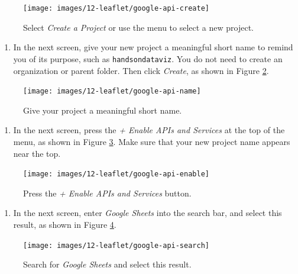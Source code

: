\documentclass[
  english,
]{book}
\providecommand{\tightlist}{%
  \setlength{\itemsep}{0pt}\setlength{\parskip}{0pt}}
\begin{document}
\begin{figure}
\texttt{[image: images/12-leaflet/google-api-create]} \caption{Select \emph{Create a Project} or use the menu to select a new project.}\label{fig:google-api-create}
\end{figure}

\begin{enumerate}
\def\labelenumi{\arabic{enumi}.}
\setcounter{enumi}{2}
\tightlist
\item
  In the next screen, give your new project a meaningful short name to remind you of its purpose, such as \texttt{handsondataviz}. You do not need to create an organization or parent folder. Then click \emph{Create}, as shown in Figure \ref{fig:google-api-name}.
\end{enumerate}



\begin{figure}
\texttt{[image: images/12-leaflet/google-api-name]} \caption{Give your project a meaningful short name.}\label{fig:google-api-name}
\end{figure}

\begin{enumerate}
\def\labelenumi{\arabic{enumi}.}
\setcounter{enumi}{3}
\tightlist
\item
  In the next screen, press the \emph{+ Enable APIs and Services} at the top of the menu, as shown in Figure \ref{fig:google-api-enable}. Make sure that your new project name appears near the top.
\end{enumerate}



\begin{figure}
\texttt{[image: images/12-leaflet/google-api-enable]} \caption{Press the \emph{+ Enable APIs and Services} button.}\label{fig:google-api-enable}
\end{figure}

\begin{enumerate}
\def\labelenumi{\arabic{enumi}.}
\setcounter{enumi}{4}
\tightlist
\item
  In the next screen, enter \emph{Google Sheets} into the search bar, and select this result, as shown in Figure \ref{fig:google-api-search}.
\end{enumerate}



\begin{figure}
\texttt{[image: images/12-leaflet/google-api-search]} \caption{Search for \emph{Google Sheets} and select this result.}\label{fig:google-api-search}
\end{figure}
\end{document}
